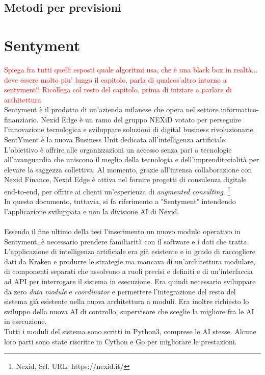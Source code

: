 \documentclass[a4paper,12pt]{report}
\begin{document}
\subsection{Metodi per previsioni}

\newpage
\section{Sentyment}
\textcolor{red}{Spiega fra tutti quelli esposti quale algoritmi usa, che è una black box in realtà... deve essere molto piu' lungo il capitolo, parla di qualcos'altro intorno a sentyment!! Ricollega col resto del capitolo, prima di iniziare a parlare di architettura\\}
Sentyment è il prodotto di un'azienda milanese che opera nel settore informatico-finanziario. Nexid Edge è un ramo del gruppo NEXiD votato per perseguire l'innovazione tecnologica e sviluppare soluzioni di digital business rivoluzionarie. SentYment è la nuova Business Unit dedicata all'intelligenza artificiale.\\
L'obiettivo è offrire alle organizzazioni un accesso senza pari a tecnologie all'avanguardia che uniscono il meglio della tecnologia e dell'imprenditorialità per elevare la saggezza collettiva. Al momento, grazie all'intensa collaborazione con Nexid Finance, Nexid Edge è attiva nel fornire progetti di consulenza digitale end-to-end, per offrire ai clienti un'esperienza di \textit{augmented consulting}. \footnote{Nexid, Srl. URL: https://nexid.it/}\\
In questo documento, tuttavia, si fa riferimento a "Sentyment" intendendo l'applicazione sviluppata e non la divisione AI di Nexid.
\\~\\
Essendo il fine ultimo della tesi l'inserimento un nuovo modulo operativo in Sentyment, è necessario prendere familiarità con il software e i dati che tratta.\\
L'applicazione di intelligenza artificiale era già esistente e in grado di raccogliere dati da Kraken e produrre le strategie ma mancava di un'architettura modulare, di componenti separati che assolvono a ruoli precisi e definiti e di un'interfaccia ad API per interrogare il sistema in esecuzione. Era quindi necessario sviluppare da zero \textit{data module} e \textit{coordinator} e permettere l'integrazione del resto del sistema già esistente nella nuova architettura a moduli. Era inoltre richiesto lo sviluppo della nuova AI di controllo, supervisore che sceglie la migliore fra le AI in esecuzione.\\
Tutti i moduli del sistema sono scritti in Python3, comprese le AI stesse. Alcune loro parti sono state riscritte in Cython e Go per migliorare le prestazioni.
\end{document}
